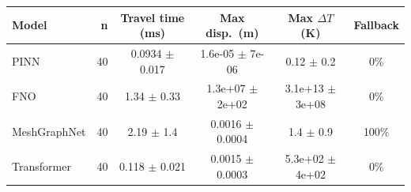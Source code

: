 \begin{tabular}{lrcccc}
\hline
Model & n & Travel time (ms) & Max disp.\ (m) & Max $\Delta T$ (K) & Fallback \\
\hline
PINN & 40 & 0.0934 $\pm$ 0.017 & 1.6e-05 $\pm$ 7e-06 & 0.12 $\pm$ 0.2 & 0\% \\
FNO & 40 & 1.34 $\pm$ 0.33 & 1.3e+07 $\pm$ 2e+02 & 3.1e+13 $\pm$ 3e+08 & 0\% \\
MeshGraphNet & 40 & 2.19 $\pm$ 1.4 & 0.0016 $\pm$ 0.0004 & 1.4 $\pm$ 0.9 & 100\% \\
Transformer & 40 & 0.118 $\pm$ 0.021 & 0.0015 $\pm$ 0.0003 & 5.3e+02 $\pm$ 4e+02 & 0\% \\
\hline
\end{tabular}
